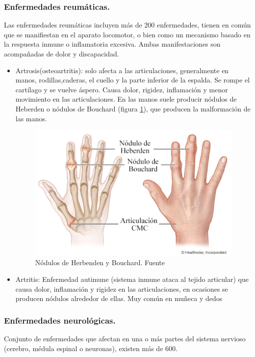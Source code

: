 \subsubsection{Enfermedades reumáticas.}
Las enfermedades reumáticas incluyen más de 200 enfermedades, tienen en común que se manifiestan en el aparato locomotor, o bien como un mecanismo basado en la respuesta inmune o inflamatoria excesiva. Ambas manifestaciones son acompañadas de dolor y discapacidad. 

\begin{itemize}
    \item Artrosis(osteoartritis): solo afecta a las articulaciones, generalmente en manos, rodillas,caderas, el cuello y la parte inferior de la espalda. Se rompe el cartílago y se vuelve áspero. Causa dolor, rigidez, inflamación y menor movimiento en las articulaciones. En las manos suele producir nódulos de Heberden o nódulos de Bouchard (figura \ref{fig:Nódulos}), que producen la malformación de las manos.

    \begin{figure}
        \centering
        \includegraphics[width=0.75\linewidth]{img/Nodulos.png}
        \caption{Nódulos de Herbenden y Bouchard. Fuente}
        \label{fig:Nódulos}
    \end{figure}
    \item Artritis: Enfermedad autimune (sistema inmune ataca al tejido articular) que causa dolor, inflamación y rigidez en las articulaciones, en ocasiones se producen nódulos alrededor de ellas. 
    Muy común en muñeca y dedos
\end{itemize}

\subsubsection{Enfermedades neurológicas.}
Conjunto de enfermedades que afectan en una o más partes del sistema nervioso (cerebro, médula espinal o neuronas), existen más de 600. \cite{}

